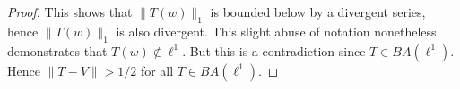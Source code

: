\documentclass[12pt]{article}
\begin{document}
\begin{proof}
	This shows that $\|T(w)\|_1$ is bounded below by a divergent series, hence $\|T(w)\|_1$ is also divergent. This slight abuse of notation nonetheless demonstrates that $T(w)\not\in\ell^1$. But this is a contradiction since $T\in BA(\ell^1)$. Hence $\|T-V\| > 1/2$ for all $T\in BA(\ell^1)$.
\end{proof}



\printbibliography
\end{document}
